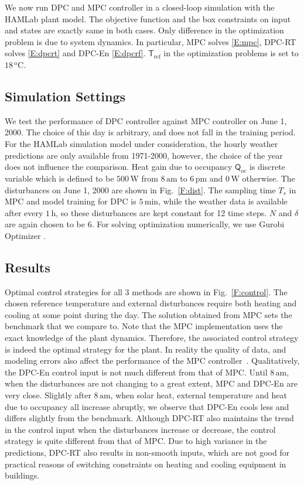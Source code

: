 
We now run DPC and MPC controller in a closed-loop simulation with the HAMLab plant model. 
The objective function and the box constraints on input and states are exactly same in both cases. Only difference in the optimization problem is due to system dynamics. In particular, MPC solves \eqref{E:mpc},  DPC-RT solves \eqref{E:dpcrt} and DPC-En \eqref{E:dpcrf}. $\mathsf{T}_{\mathrm{ref}}$ in the optimization problems is set to $18\,\mathrm{^oC}$. 


\subsection{Simulation Settings}
We test the performance of DPC controller against MPC controller on June 1, 2000. The choice of this day is arbitrary, and does not fall in the training period. For the HAMLab simulation model under consideration, the hourly weather predictions are only available from 1971-2000, however, the choice of the year does not influence the comparison. 
Heat gain due to occupancy $\mathsf{Q}_{\mathrm{oc}}$ is discrete variable which is defined to be $500\,\mathrm{W}$ from $8\,\mathrm{am}$ to $6\,\mathrm{pm}$ and $0\,\mathrm{W}$ otherwise. The disturbances on June 1, 2000 are shown in Fig.~\ref{F:dist}. The sampling time $T_s$ in MPC and model training for DPC is $5\,\mathrm{min}$, while the weather data is available after every $1\,\mathrm{h}$, so these disturbances are kept constant for 12 time steps. 
$N$ and $\delta$ are again chosen to be $6$. For solving optimization numerically, we use Gurobi Optimizer \cite{Gurobi2015}.

\subsection{Results}

Optimal control strategies for all 3 methods are shown in Fig.~\ref{F:control}. The chosen reference temperature and external disturbances require both heating and cooling at some point during the day. The solution obtained from MPC sets the benchmark that we compare to. 
Note that the MPC implementation uses the exact knowledge of the plant dynamics. Therefore, the associated control strategy is indeed the optimal strategy for the plant.
In reality the quality of data, and modeling errors also affect the performance of the MPC controller~\cite{behl2014model}.
Qualitatively, the DPC-En control input is not much different from that of MPC. Until $8\,\mathrm{am}$, when the disturbances are not changing to a great extent, MPC and DPC-En are very close. Slightly after $8\,\mathrm{am}$, when solar heat, external temperature and heat due to occupancy all increase abruptly, we observe that DPC-En cools less and differs slightly from the benchmark. Although DPC-RT also maintains the trend in the control input when the disturbances increase or decrease, the control strategy is quite different from that of MPC. Due to high variance in the predictions, DPC-RT also results in non-smooth inputs, which are not good for practical reasons of switching constraints on heating and cooling equipment in buildings.

